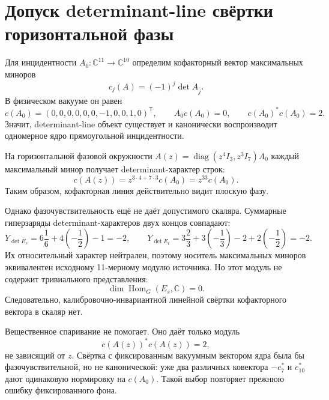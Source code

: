 \chapter{Допуск determinant-line свёртки горизонтальной фазы}
\label{ch:v8-horizontal-phase-determinant-line-admission-gate}

Для инцидентности $A_0:\mathbb C^{11}\to\mathbb C^{10}$ определим
кофакторный вектор максимальных миноров
\begin{equation}
 c_j(A)=(-1)^j\det A_{\widehat j}.
 \label{eq:v8-horizontal-cofactor-vector}
\end{equation}
В физическом вакууме он равен
\begin{equation}
 c(A_0)=(0,0,0,0,0,0,-1,0,0,1,0)^{\mathsf T},
 \qquad A_0c(A_0)=0,
 \qquad c(A_0)^*c(A_0)=2.
 \label{eq:v8-horizontal-cofactor-kernel}
\end{equation}
Значит, determinant-line объект существует и канонически воспроизводит
одномерное ядро прямоугольной инцидентности.

На горизонтальной фазовой окружности
$A(z)=\operatorname{diag}(z^4I_3,z^3I_7)A_0$ каждый максимальный минор
получает determinant-характер строк:
\begin{equation}
 c(A(z))=z^{3\cdot4+7\cdot3}c(A_0)=z^{33}c(A_0).
 \label{eq:v8-horizontal-cofactor-phase-weight}
\end{equation}
Таким образом, кофакторная линия действительно видит плоскую фазу.

Однако фазочувствительность ещё не даёт допустимого скаляра. Суммарные
гиперзаряды determinant-характеров двух концов совпадают:
\begin{equation}
 Y_{\det E_s}=6\frac16+4\left(-\frac12\right)-1=-2,
 \qquad
 Y_{\det E_t}=3\frac23+3\left(-\frac13\right)-2+2\left(-\frac12\right)=-2.
 \label{eq:v8-horizontal-determinant-hypercharges}
\end{equation}
Их относительный характер нейтрален, поэтому носитель максимальных миноров
эквивалентен исходному 11-мерному модулю источника. Но этот модуль не
содержит тривиального представления:
\begin{equation}
 \dim\operatorname{Hom}_G(E_s,\mathbb C)=0.
 \label{eq:v8-horizontal-no-invariant-functional}
\end{equation}
Следовательно, калибровочно-инвариантной линейной свёртки кофакторного
вектора в скаляр нет.

Вещественное спаривание не помогает. Оно даёт только модуль
\begin{equation}
 c(A(z))^*c(A(z))=2,
 \label{eq:v8-horizontal-real-pair-modulus}
\end{equation}
не зависящий от $z$. Свёртка с фиксированным вакуумным вектором ядра была
бы фазочувствительной, но не канонической: уже два различных ковектора
$-e_7^*$ и $e_{10}^*$ дают одинаковую нормировку на $c(A_0)$. Такой выбор
повторяет прежнюю ошибку фиксированного фона.


